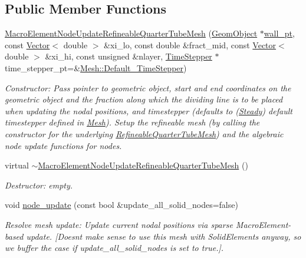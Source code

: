 \subsection*{Public Member Functions}
\begin{DoxyCompactItemize}
\item 
\hyperlink{classoomph_1_1MacroElementNodeUpdateRefineableQuarterTubeMesh_a05355134c7930d4aa73969f6c743ed17}{Macro\+Element\+Node\+Update\+Refineable\+Quarter\+Tube\+Mesh} (\hyperlink{classoomph_1_1GeomObject}{Geom\+Object} $\ast$\hyperlink{classoomph_1_1QuarterTubeMesh_af59c4cde343ddd76caea4bc8c8ad8b94}{wall\+\_\+pt}, const \hyperlink{classoomph_1_1Vector}{Vector}$<$ double $>$ \&xi\+\_\+lo, const double \&fract\+\_\+mid, const \hyperlink{classoomph_1_1Vector}{Vector}$<$ double $>$ \&xi\+\_\+hi, const unsigned \&nlayer, \hyperlink{classoomph_1_1TimeStepper}{Time\+Stepper} $\ast$time\+\_\+stepper\+\_\+pt=\&\hyperlink{classoomph_1_1Mesh_a12243d0fee2b1fcee729ee5a4777ea10}{Mesh\+::\+Default\+\_\+\+Time\+Stepper})
\begin{DoxyCompactList}\small\item\em Constructor\+: Pass pointer to geometric object, start and end coordinates on the geometric object and the fraction along which the dividing line is to be placed when updating the nodal positions, and timestepper (defaults to (\hyperlink{classoomph_1_1Steady}{Steady}) default timestepper defined in \hyperlink{classoomph_1_1Mesh}{Mesh}). Setup the refineable mesh (by calling the constructor for the underlying \hyperlink{classoomph_1_1RefineableQuarterTubeMesh}{Refineable\+Quarter\+Tube\+Mesh}) and the algebraic node update functions for nodes. \end{DoxyCompactList}\item 
virtual \hyperlink{classoomph_1_1MacroElementNodeUpdateRefineableQuarterTubeMesh_ae4a4028ac41a7721c87bd484be894d02}{$\sim$\+Macro\+Element\+Node\+Update\+Refineable\+Quarter\+Tube\+Mesh} ()
\begin{DoxyCompactList}\small\item\em Destructor\+: empty. \end{DoxyCompactList}\item 
void \hyperlink{classoomph_1_1MacroElementNodeUpdateRefineableQuarterTubeMesh_a6255c22765a484ac11642ade0c084082}{node\+\_\+update} (const bool \&update\+\_\+all\+\_\+solid\+\_\+nodes=false)
\begin{DoxyCompactList}\small\item\em Resolve mesh update\+: Update current nodal positions via sparse Macro\+Element-\/based update. \mbox{[}Doesn\textquotesingle{}t make sense to use this mesh with Solid\+Elements anyway, so we buffer the case if update\+\_\+all\+\_\+solid\+\_\+nodes is set to true.\mbox{]}. \end{DoxyCompactList}\end{DoxyCompactItemize}
